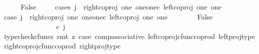 \begin{isabellebody}
\ \ \ \ \isamarkupfalse%
\ False\isanewline
\ \ \ \ \isamarkupfalse%
{\isacharparenleft}{\kern0pt}cases\ {\isachardoublequoteopen}j\ {\isacharequal}{\kern0pt}\ right{\isacharunderscore}{\kern0pt}coproj\ one\ {\isacharparenleft}{\kern0pt}one{\isasymCoprod}one{\isacharparenright}{\kern0pt}{\isasymcirc}\isactrlsub c\ left{\isacharunderscore}{\kern0pt}coproj\ one\ one{\isachardoublequoteclose}{\isacharparenright}{\kern0pt}\isanewline
\ \ \ \ \ \ \isamarkupfalse%
\ case{}{\isacharcolon}{\kern0pt}\ {\isachardoublequoteopen}j\ {\isacharequal}{\kern0pt}\ right{\isacharunderscore}{\kern0pt}coproj\ one\ {\isacharparenleft}{\kern0pt}one{\isasymCoprod}one{\isacharparenright}{\kern0pt}{\isasymcirc}\isactrlsub c\ left{\isacharunderscore}{\kern0pt}coproj\ one\ one{\isachardoublequoteclose}\isanewline
\ \ \ \ \ \ \isamarkupfalse%
\ False\isanewline
\ \ \ \ \ \ \isamarkupfalse%
\ {\isacharminus}{\kern0pt}\ \isanewline
\ \ \ \ \ \ \ \ \isamarkupfalse%
\ {\isachardoublequoteopen}{\isacharparenleft}{\kern0pt}{\isasymlangle}{\isasymt}{\isacharcomma}{\kern0pt}\ {\isasymt}{\isasymrangle}{\isasymamalg}\ {\isacharparenleft}{\kern0pt}{\isasymlangle}{\isasymf}{\isacharcomma}{\kern0pt}\ {\isasymf}{\isasymrangle}\ {\isasymamalg}{\isasymlangle}{\isasymf}{\isacharcomma}{\kern0pt}\ {\isasymt}{\isasymrangle}{\isacharparenright}{\kern0pt}{\isacharparenright}{\kern0pt}\ {\isasymcirc}\isactrlsub c\ j\ {\isacharequal}{\kern0pt}\ {\isasymlangle}{\isasymf}{\isacharcomma}{\kern0pt}\ {\isasymf}{\isasymrangle}{\isachardoublequoteclose}\isanewline
\ \ \ \ \ \ \ \ \ \ \isamarkupfalse%
\ {\isacharparenleft}{\kern0pt}typecheck{\isacharunderscore}{\kern0pt}cfuncs{\isacharcomma}{\kern0pt}\ smt\ {\isacharparenleft}{\kern0pt}z{}{\isacharparenright}{\kern0pt}\ case{}\ comp{\isacharunderscore}{\kern0pt}associative{}\ left{\isacharunderscore}{\kern0pt}coproj{\isacharunderscore}{\kern0pt}cfunc{\isacharunderscore}{\kern0pt}coprod\ left{\isacharunderscore}{\kern0pt}proj{\isacharunderscore}{\kern0pt}type\ right{\isacharunderscore}{\kern0pt}coproj{\isacharunderscore}{\kern0pt}cfunc{\isacharunderscore}{\kern0pt}coprod\ right{\isacharunderscore}{\kern0pt}proj{\isacharunderscore}{\kern0pt}type{\isacharparenright}{\kern0pt}\isanewline
\ \ \ \ \ \ \ \ \isamarkupfalse%
\ \isamarkupfalse%
\ {\isachardoublequoteopen}{\isasymlangle}{\isasymt}{\isacharcomma}{\kern0pt}\ {\isasymt}{\isasymrangle}\ {\isacharequal}{\kern0pt}\ {\isasymlangle}{\isasymf}{\isacharcomma}{\kern0pt}{\isasymf}{\isasymrangle}{\isachardoublequoteclose}\isanewline

\end{isabellebody}
